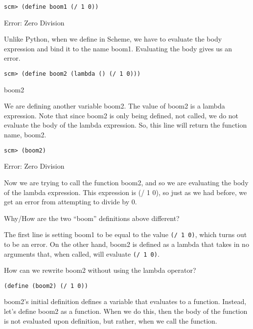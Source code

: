 \begin{blocksection}
\begin{lstlisting}
scm> (define boom1 (/ 1 0))
\end{lstlisting}
\begin{solution}[0.25in]
Error: Zero Division

Unlike Python, when we define in Scheme, we have to evaluate the body expression and bind it to the name boom1. Evaluating the body gives us an error.

\end{solution}

\begin{lstlisting}
scm> (define boom2 (lambda () (/ 1 0)))
\end{lstlisting}
\begin{solution}[0.25in]
boom2

We are defining another variable boom2. The value of boom2 is a lambda expression. Note that since boom2 is only being defined, not called, we do not evaluate the body of the lambda expression. So, this line will return the function name, boom2.

\end{solution}

\begin{lstlisting}
scm> (boom2)
\end{lstlisting}
\begin{solution}[0.25in]
Error: Zero Division

Now we are trying to call the function boom2, and so we are evaluating the body of the lambda expression. This expression is (/ 1 0), so just as we had before, we get an error from attempting to divide by 0.
\end{solution}
\end{blocksection}

\begin{blocksection}
Why/How are the two ``boom'' definitions above different?
\begin{solution}[1in]
The first line is setting boom1 to be equal to the value \texttt{(/ 1 0)}, which
turns out to be an error. On the other hand, boom2 is defined as a lambda that
takes in no arguments that, when called, will evaluate \texttt{(/ 1 0)}.
\end{solution}
How can we rewrite boom2 without using the lambda operator?
\begin{solution}[0.5in]
\begin{lstlisting}
(define (boom2) (/ 1 0))
\end{lstlisting}
boom2’s initial definition defines a variable that evaluates to a function. Instead, let’s define boom2 as a function. When we do this, then the body of the function is not evaluated upon definition, but rather, when we call the function.

\end{solution}
\end{blocksection}
